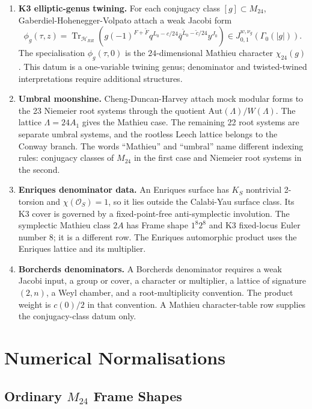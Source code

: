 \documentclass[11pt]{article}
\providecommand{\Aut}{\mathrm{Aut}}
\providecommand{\cO}{\mathcal{O}}
\providecommand{\Mtf}{M_{24}}
\begin{document}
\begin{enumerate}[label=(\Alph*)]
\item \textbf{K3 elliptic-genus twining.}
For each conjugacy class \([g]\subset \Mtf\), Gaberdiel-Hohenegger-Volpato
attach a weak Jacobi form
\[
  \phi_g(\tau,z)
  =\operatorname{Tr}_{\mathcal H_{RR}}
  \left(g(-1)^{F+\widetilde F}q^{L_0-c/24}
  \bar q^{\widetilde L_0-\widetilde c/24}y^{J_0}\right)
  \in J^{w,\nu_g}_{0,1}(\Gamma_0(|g|)).
\]
The specialisation \(\phi_g(\tau,0)\) is the \(24\)-dimensional
Mathieu character \(\chi_{24}(g)\).  This datum is a one-variable
twining genus; denominator and twisted-twined interpretations require
additional structures.

\item \textbf{Umbral moonshine.}
Cheng-Duncan-Harvey attach mock modular forms to the 23 Niemeier
root systems through the quotient
\(\Aut(\Lambda)/W(\Lambda)\).  The lattice \(\Lambda=24A_1\) gives the
Mathieu case.  The remaining 22 root systems are separate umbral
systems, and the rootless Leech lattice belongs to the Conway branch.
The words ``Mathieu'' and ``umbral'' name different indexing rules:
conjugacy classes of \(M_{24}\) in the first case and Niemeier root
systems in the second.

\item \textbf{Enriques denominator data.}
An Enriques surface has \(K_S\) nontrivial
2-torsion and \(\chi(\cO_S)=1\), so it lies outside the Calabi-Yau
surface class.  Its K3 cover is governed by a
fixed-point-free anti-symplectic involution.  The symplectic Mathieu
class \(2A\) has Frame shape \(1^8 2^8\) and K3 fixed-locus Euler
number \(8\); it is a different row.  The Enriques automorphic product
uses the Enriques lattice and its multiplier.

\item \textbf{Borcherds denominators.}
A Borcherds denominator requires a weak Jacobi input, a group or cover,
a character or multiplier, a lattice of signature \((2,n)\), a Weyl
chamber, and a root-multiplicity convention.  The product weight is
\(c(0)/2\) in that convention.  A Mathieu character-table row supplies
the conjugacy-class datum only.
\end{enumerate}

\section{Numerical Normalisations}

\subsection{Ordinary \(M_{24}\) Frame Shapes}
\end{document}
